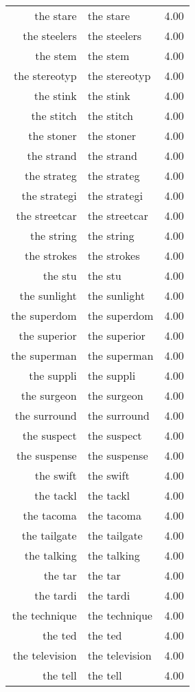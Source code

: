 \begin{table}[ht]
\begin{tabular}{rlr}
  the stare & the stare & 4.00 \\ 
  the steelers & the steelers & 4.00 \\ 
  the stem & the stem & 4.00 \\ 
  the stereotyp & the stereotyp & 4.00 \\ 
  the stink & the stink & 4.00 \\ 
  the stitch & the stitch & 4.00 \\ 
  the stoner & the stoner & 4.00 \\ 
  the strand & the strand & 4.00 \\ 
  the strateg & the strateg & 4.00 \\ 
  the strategi & the strategi & 4.00 \\ 
  the streetcar & the streetcar & 4.00 \\ 
  the string & the string & 4.00 \\ 
  the strokes & the strokes & 4.00 \\ 
  the stu & the stu & 4.00 \\ 
  the sunlight & the sunlight & 4.00 \\ 
  the superdom & the superdom & 4.00 \\ 
  the superior & the superior & 4.00 \\ 
  the superman & the superman & 4.00 \\ 
  the suppli & the suppli & 4.00 \\ 
  the surgeon & the surgeon & 4.00 \\ 
  the surround & the surround & 4.00 \\ 
  the suspect & the suspect & 4.00 \\ 
  the suspense & the suspense & 4.00 \\ 
  the swift & the swift & 4.00 \\ 
  the tackl & the tackl & 4.00 \\ 
  the tacoma & the tacoma & 4.00 \\ 
  the tailgate & the tailgate & 4.00 \\ 
  the talking & the talking & 4.00 \\ 
  the tar & the tar & 4.00 \\ 
  the tardi & the tardi & 4.00 \\ 
  the technique & the technique & 4.00 \\ 
  the ted & the ted & 4.00 \\ 
  the television & the television & 4.00 \\ 
  the tell & the tell & 4.00 \\ 

\end{tabular}
\end{table}

